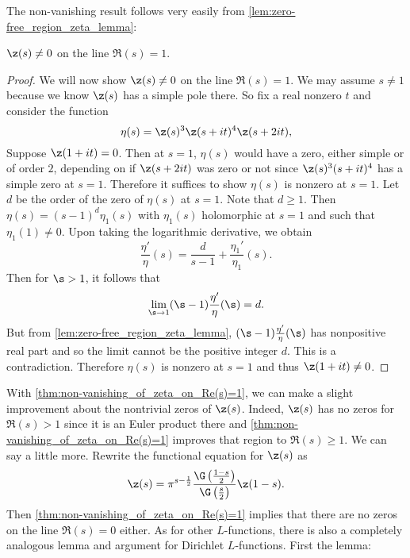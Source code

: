       The non-vanishing result follows very easily from \cref{lem:zero-free_region_zeta_lemma}:

      \begin{theorem}\label{thm:non-vanishing_of_zeta_on_Re(s)=1}
        $\z(s) \neq 0$ on the line $\Re(s) = 1$.
      \end{theorem}
      \begin{proof}
        We will now show $\z(s) \neq 0$ on the line $\Re(s) = 1$. We may assume $s \neq 1$ because we know $\z(s)$ has a simple pole there. So fix a real nonzero $t$ and consider the function
        \[
          \eta(s) = \z(s)^{3}\z(s+it)^{4}\z(s+2it),
        \]
        Suppose $\z(1+it) = 0$. Then at $s = 1$, $\eta(s)$ would have a zero, either simple or of order $2$, depending on if $\z(s+2it)$ was zero or not since $\z(s)^{3}(s+it)^{4}$ has a simple zero at $s = 1$. Therefore it suffices to show $\eta(s)$ is nonzero at $s = 1$. Let $d$ be the order of the zero of $\eta(s)$ at $s = 1$. Note that $d \ge 1$. Then $\eta(s) = (s-1)^{d}\eta_{1}(s)$ with $\eta_{1}(s)$ holomorphic at $s = 1$ and such that $\eta_{1}(1) \neq 0$. Upon taking the logarithmic derivative, we obtain
        \[
          \frac{\eta'}{\eta}(s) = \frac{d}{s-1}+\frac{\eta_{1}'}{\eta_{1}}(s).
        \]
        Then for $\s > 1$, it follows that
        \[
          \lim_{\s \to 1}(\s-1)\frac{\eta'}{\eta}(\s) = d.
        \]
        But from \cref{lem:zero-free_region_zeta_lemma}, $(\s-1)\frac{\eta'}{\eta}(\s)$ has nonpositive real part and so the limit cannot be the positive integer $d$. This is a contradiction. Therefore $\eta(s)$ is nonzero at $s = 1$ and thus $\z(1+it) \neq 0$.
      \end{proof}

      With \cref{thm:non-vanishing_of_zeta_on_Re(s)=1}, we can make a slight improvement about the nontrivial zeros of $\z(s)$. Indeed, $\z(s)$ has no zeros for $\Re(s) > 1$ since it is an Euler product there and \cref{thm:non-vanishing_of_zeta_on_Re(s)=1} improves that region to $\Re(s) \ge 1$. We can say a little more. Rewrite the functional equation for $\z(s)$ as
      \[
        \z(s) = \pi^{s-\frac{1}{2}}\frac{\G\left(\frac{1-s}{2}\right)}{\G\left(\frac{s}{2}\right)}\z(1-s).
      \]
      Then \cref{thm:non-vanishing_of_zeta_on_Re(s)=1} implies that there are no zeros on the line $\Re(s) = 0$ either. As for other $L$-functions, there is also a completely analogous lemma and argument for Dirichlet $L$-functions. First the lemma:

